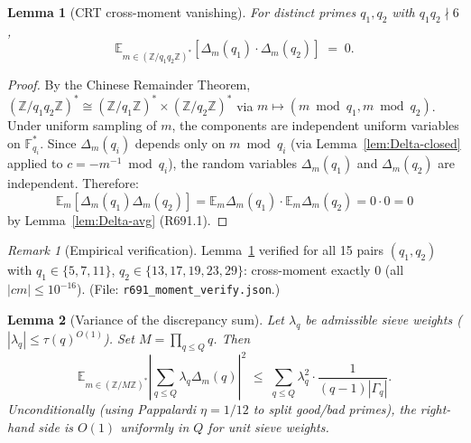 \documentclass[12pt]{amsart}
\newtheorem{lemma}{Lemma}
\theoremstyle{definition}
\theoremstyle{remark}
\newtheorem{remark}{Remark}
\begin{document}
\begin{lemma}[CRT cross-moment vanishing]\label{lem:CRT}
For distinct primes $q_1, q_2$ with $q_1 q_2 \nmid 6$,
$$
\mathbb{E}_{m \in (\mathbb{Z}/q_1 q_2 \mathbb{Z})^*}
\left[ \Delta_m(q_1) \cdot \Delta_m(q_2) \right]
\;=\;
0.
$$
\end{lemma}

\begin{proof}
By the Chinese Remainder Theorem, $(\mathbb{Z}/q_1 q_2 \mathbb{Z})^* \cong (\mathbb{Z}/q_1 \mathbb{Z})^* \times (\mathbb{Z}/q_2 \mathbb{Z})^*$ via $m \mapsto (m \bmod q_1, m \bmod q_2)$. Under uniform sampling of $m$, the components are independent uniform variables on $\mathbb{F}_{q_i}^*$. Since $\Delta_m(q_i)$ depends only on $m \bmod q_i$ (via Lemma~\ref{lem:Delta-closed} applied to $c = -m^{-1} \bmod q_i$), the random variables $\Delta_m(q_1)$ and $\Delta_m(q_2)$ are independent. Therefore:
$$
\mathbb{E}_m [\Delta_m(q_1) \Delta_m(q_2)]
= \mathbb{E}_m \Delta_m(q_1) \cdot \mathbb{E}_m \Delta_m(q_2)
= 0 \cdot 0 = 0
$$
by Lemma~\ref{lem:Delta-avg} (R691.1).
\end{proof}

\begin{remark}[Empirical verification]
Lemma~\ref{lem:CRT} verified for all 15 pairs $(q_1, q_2)$ with $q_1 \in \{5, 7, 11\}$, $q_2 \in \{13, 17, 19, 23, 29\}$: cross-moment exactly $0$ (all $|cm| \le 10^{-16}$). \hfill(File: \texttt{r691\_moment\_verify.json}.)
\end{remark}

\begin{lemma}[Variance of the discrepancy sum]\label{lem:var-sum}
Let $\lambda_q$ be admissible sieve weights ($|\lambda_q| \le \tau(q)^{O(1)}$). Set $M = \prod_{q \le Q} q$. Then
$$
\mathbb{E}_{m \in (\mathbb{Z}/M\mathbb{Z})^*}
\left| \sum_{q \le Q} \lambda_q \Delta_m(q) \right|^2
\;\le\;
\sum_{q \le Q} \lambda_q^2 \cdot \frac{1}{(q-1) |\Gamma_q|}.
$$
Unconditionally (using Pappalardi $\eta = 1/12$ to split good/bad primes), the right-hand side is $O(1)$ uniformly in $Q$ for unit sieve weights.
\end{lemma}
\end{document}
